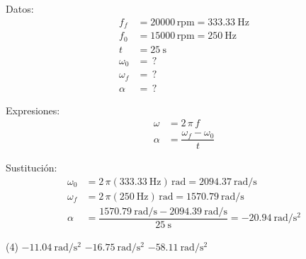 \documentclass[12pt, letter]{exam}
\begin{document}
\begin{questions}
    \begin{minipage}[t]{0.4\linewidth}
    Datos: 
    \begin{align*}
    f_{f} &= 20000 \, \text{rpm} = \SI{333.33}{\hertz} \\
    f_{0} &= 15000 \, \text{rpm} = \SI{250}{\hertz} \\
    t &= \SI{25}{\second} \\
    \omega_{0} &= \, ? \\
    \omega_{f} &= \, ? \\
    \alpha &= \, ?
    \end{align*}
    \end{minipage}
    \hspace{1cm}
    \begin{minipage}[t]{0.4\linewidth}
    Expresiones:
    \begin{align*}
    \omega &= 2 \, \pi \, f \\
    \alpha &= \dfrac{\omega_{f} - \omega_{0}}{t}
    \end{align*}
    \end{minipage}

    Sustitución:
    \begin{align*}
    \omega_{0} &= 2 \, \pi (\SI{333.33}{\hertz}) \, \unit{\radian} = \SI[per-mode=fraction]{2094.37}{\radian\per\second} \\[0.5em]
    \omega_{f} &= 2 \, \pi (\SI{250}{\hertz}) \, \unit{\radian} = \SI[per-mode=fraction]{1570.79}{\radian\per\second} \\[0.5em]
    \alpha &= \dfrac{ \displaystyle \SI[per-mode=fraction]{1570.79}{\radian\per\second} - \SI[per-mode=fraction]{2094.39}{\radian\per\second} }{\SI{25}{\second}} = - \SI[per-mode=fraction]{20.94}{\radian\per\square\second}
    \end{align*}

    \vspace{0.3cm}
    \begin{tasks}(4)
        \task $\displaystyle -\SI[per-mode=fraction]{11.04}{\radian\per\square\second}$
        \task $\displaystyle -\SI[per-mode=fraction]{16.75}{\radian\per\square\second}$
        \task {}
        \task $\displaystyle -\SI[per-mode=fraction]{58.11}{\radian\per\square\second}$
    \end{tasks}


\end{questions}
\end{document}
